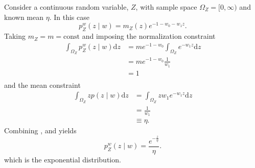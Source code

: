 \begin{example}
	Consider a continuous random variable, $Z$, with sample space $\Omega_Z = [0,\infty)$ and known mean $\eta$. In this case
	\begin{equation}
		p_{Z}^w(z \mid w) = m_Z(z) e^{-1-w_0 - w_1 z}.
		\label{eq:n13}
	\end{equation}
	Taking $m_Z =m = \text{const}$ and imposing the normalization constraint
	\begin{equation}
		\begin{split}
			\int_{\Omega_Z} p_{Z}^w(z \mid w) \mathrm{d}z &= m e^{-1-w_0}\int_{\Omega_Z} e^{- w_1 z} \mathrm{d}z\\
			& = m e^{-1-w_0} \frac{1}{w_1}\\
			&= 1\\
		\end{split}
		\label{eq:na1}
	\end{equation}
	and the mean constraint
	\begin{equation}
		\begin{split}
			\int_{\Omega_Z} z p(z \mid w) \mathrm{d}z&= \int_{\Omega_Z} z w_1 e^{-w_1 z} \mathrm{d}z\\
			& = \frac{1}{w_1}\\
			&\equiv \eta.
		\end{split}
		\label{eq:na2}
	\end{equation}
	Combining ,  and  yields
	\begin{equation}
		p_{Z}^w(z \mid w) = \frac{e^{- \frac{z}{\eta}}}{\eta}.
	\end{equation}
	which is the exponential distribution.
\end{example}

